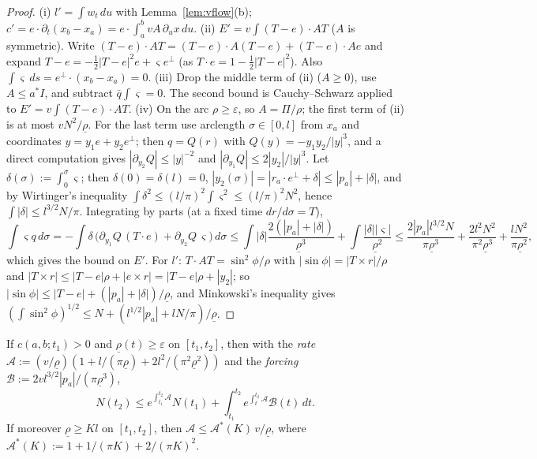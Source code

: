 \begin{proof}
(i) $l'=\int w_t\,du$ with Lemma~\ref{lem:vflow}(b); $c'=e\cdot\partial_t(x_b-x_a)=e\cdot\int_a^bvA\,\partial_ux\,du$.
(ii) $E'=v\int(T-e)\cdot AT$ ($A$ is symmetric). Write $(T-e)\cdot AT=(T-e)\cdot A(T-e)+(T-e)\cdot Ae$ and expand
$T-e=-\frac12|T-e|^2e+\varsigma e^\perp$ (as $T\cdot e=1-\frac12|T-e|^2$). Also $\int\varsigma\,ds=e^\perp\cdot(x_b-x_a)=0$.
(iii) Drop the middle term of (ii) ($A\ge0$), use $A\le a^*I$, and subtract $\bar q\int\varsigma=0$. The second bound is
Cauchy--Schwarz applied to $E'=v\int(T-e)\cdot AT$.
(iv) On the arc $\rho\ge\varepsilon$, so $A=\Pi/\rho$; the first term of (ii) is at most $vN^2/\underline\rho$. For the
last term use arclength $\sigma\in[0,l]$ from $x_a$ and coordinates $y=y_1e+y_2e^\perp$; then $q=Q(r)$ with
$Q(y)=-y_1y_2/|y|^3$, and a direct computation gives $|\partial_{y_2}Q|\le|y|^{-2}$ and $|\partial_{y_1}Q|\le2|y_2|/|y|^3$.
Let $\delta(\sigma):=\int_0^\sigma\varsigma$; then $\delta(0)=\delta(l)=0$, $|y_2(\sigma)|=|r_a\cdot e^\perp+\delta|\le|p_a|+|\delta|$,
and by Wirtinger's inequality \cite[Thm.~257]{HLP} $\int\delta^2\le(l/\pi)^2\int\varsigma^2\le(l/\pi)^2N^2$, hence
$\int|\delta|\le l^{3/2}N/\pi$. Integrating by parts (at a fixed time $dr/d\sigma=T$),
\[
\int\varsigma q\,d\sigma=-\int\delta\,\bigl(\partial_{y_1}Q\,(T\cdot e)+\partial_{y_2}Q\,\varsigma\bigr)\,d\sigma
\le\int|\delta|\frac{2(|p_a|+|\delta|)}{\underline\rho^3}+\int\frac{|\delta||\varsigma|}{\underline\rho^2}
\le\frac{2|p_a|l^{3/2}N}{\pi\underline\rho^3}+\frac{2l^2N^2}{\pi^2\underline\rho^3}+\frac{lN^2}{\pi\underline\rho^2},
\]
which gives the bound on $E'$. For $l'$: $T\cdot AT=\sin^2\phi/\rho$ with $|\sin\phi|=|T\times r|/\rho$ and
$|T\times r|\le|T-e|\rho+|e\times r|=|T-e|\rho+|y_2|$; so $|\sin\phi|\le|T-e|+(|p_a|+|\delta|)/\underline\rho$, and
Minkowski's inequality gives $(\int\sin^2\phi)^{1/2}\le N+(l^{1/2}|p_a|+lN/\pi)/\underline\rho$.
\end{proof}

\begin{lemma}\label{lem:duhamel}
If $c(a,b;t_1)>0$ and $\underline\rho(t)\ge\varepsilon$ on $[t_1,t_2]$, then with the \emph{rate}
$\mathcal A:=(v/\underline\rho)(1+l/(\pi\underline\rho)+2l^2/(\pi^2\underline\rho^2))$ and the \emph{forcing}
$\mathcal B:=2vl^{3/2}|p_a|/(\pi\underline\rho^3)$,
\[
N(t_2)\le e^{\int_{t_1}^{t_2}\mathcal A}N(t_1)+\int_{t_1}^{t_2}e^{\int_t^{t_2}\mathcal A}\mathcal B(t)\,dt .
\]
If moreover $\underline\rho\ge Kl$ on $[t_1,t_2]$, then $\mathcal A\le\mathcal A^*(K)\,v/\underline\rho$, where
$\mathcal A^*(K):=1+1/(\pi K)+2/(\pi K)^2$.
\end{lemma}

